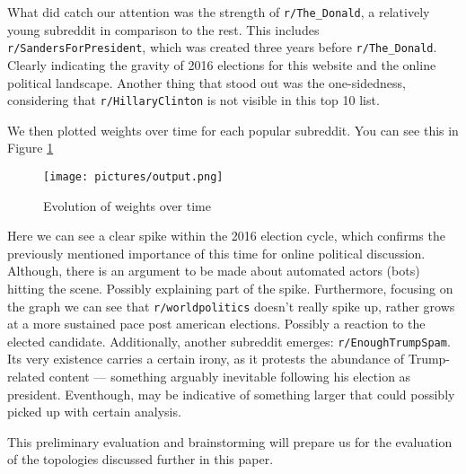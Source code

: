 \documentclass{article}
\begin{document}
What did catch our attention was the strength of \texttt{r/The\_Donald}, a relatively young subreddit in comparison to the rest. This includes \texttt{r/SandersForPresident}, which was created three years before \texttt{r/The\_Donald}. Clearly indicating the gravity of 2016 elections for this website and the online political landscape. Another thing that stood out was the one-sidedness, considering that \texttt{r/HillaryClinton} is not visible in this top 10 list.

We then plotted weights over time for each popular subreddit. You  can see this in Figure \ref{fig:weight_evolution}

\begin{figure}[htb]
    \centering
    \texttt{[image: pictures/output.png]}
    \caption{Evolution of weights over time}
    \label{fig:weight_evolution}
\end{figure}
\newpage
Here we can see a clear spike within the 2016 election cycle, which confirms the previously mentioned importance of this time for online political discussion. Although, there is an argument to be made about automated actors (bots) hitting the scene. Possibly explaining part of the spike. %
Furthermore, focusing on the graph we can see that \texttt{r/worldpolitics} doesn't really spike up, rather grows at a more sustained pace post american elections. Possibly a reaction to the elected candidate. Additionally, another subreddit emerges: \texttt{r/EnoughTrumpSpam}. Its very existence carries a certain irony, as it protests the abundance of Trump-related content — something arguably inevitable following his election as president. Eventhough, may be indicative of something larger that could possibly picked up with certain analysis.

This preliminary evaluation and brainstorming will prepare us for the evaluation of the topologies discussed further in this paper.




\end{document}
